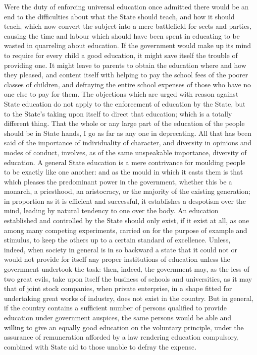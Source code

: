 \documentclass[11pt,openany]{book}
\begin{document}
Were the duty of enforcing universal education once admitted there would be an end to the difficulties about what the State should teach, and how it should teach, which now convert the subject into a mere battlefield for sects and parties, causing the time and labour which should have been spent in educating to be wasted in quarreling about education. If the government would make up its mind to require for every child a good education, it might save itself the trouble of providing one. It might leave to parents to obtain the education where and how they pleased, and content itself with helping to pay the school fees of the poorer classes of children, and defraying the entire school expenses of those who have no one else to pay for them. The objections which are urged with reason against State education do not apply to the enforcement of education by the State, but to the State's taking upon itself to direct that education; which is a totally different thing. That the whole or any large part of the education of the people should be in State hands, I go as far as any one in deprecating. All that has been said of the importance of individuality of character, and diversity in opinions and modes of conduct, involves, as of the same unspeakable importance, diversity of education. A general State education is a mere contrivance for moulding people to be exactly like one another: and as the mould in which it casts them is that which pleases the predominant power in the government, whether this be a monarch, a priesthood, an aristocracy, or the majority of the existing generation; in proportion as it is efficient and successful, it establishes a despotism over the mind, leading by natural tendency to one over the body. An education established and controlled by the State should only exist, if it exist at all, as one among many competing experiments, carried on for the purpose of example and stimulus, to keep the others up to a certain standard of excellence. Unless, indeed, when society in general is in so backward a state that it could not or would not provide for itself any proper institutions of education unless the government undertook the task: then, indeed, the government may, as the less of two great evils, take upon itself the business of schools and universities, as it may that of joint stock companies, when private enterprise, in a shape fitted for undertaking great works of industry, does not exist in the country. But in general, if the country contains a sufficient number of persons qualified to provide education under government auspices, the same persons would be able and willing to give an equally good education on the voluntary principle, under the assurance of remuneration afforded by a law rendering education compulsory, combined with State aid to those unable to defray the expense.
\end{document}
